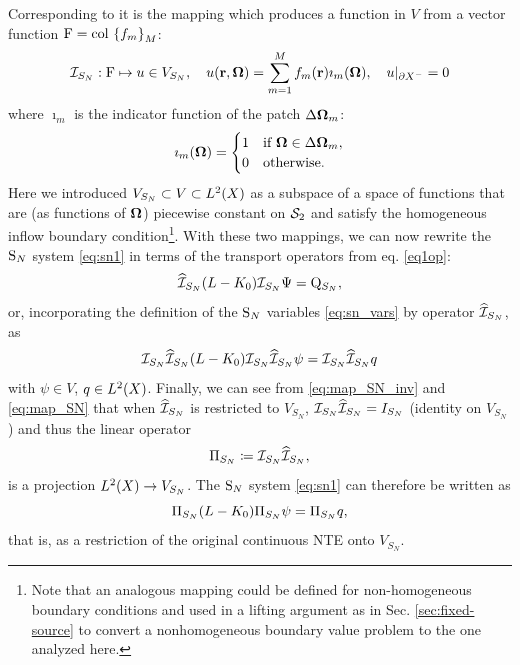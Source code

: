 %
Corresponding to it is the mapping which produces a function in $V$ from a vector function 
\mbox{$\mathrm{F} = \colset{f_m}{\idxset{M}}$}:
\begin{equation}\label{eq:map_SN}
\PiSN: \mathrm{F} \mapsto u\in V_{S_N},\quad
u(\br,\bomega) = \sum_{m=1}^M f_m(\br)\imath_m(\bomega),\quad
u\vert_{\pX[-]} = 0
\end{equation}
where $\imath_m$ is the indicator function of the patch $\Delta\bomega_m$:
\begin{equation}\label{eq:indicator}
\imath_m(\bomega) = \pw{1}{if $\bomega \in \Delta\bomega_m$}{0}{otherwise.}
\end{equation}
Here we introduced $V_{S_N}\subset V \subset \Lp[2](X)$ as a subspace of a space of functions that
are (as functions of $\bomega$) piecewise constant on $\Sphere$ and satisfy the homogeneous inflow boundary condition\footnote{Note that an
analogous mapping could be defined for non-homogeneous boundary conditions and used in a lifting argument
as in Sec. \ref{sec:fixed-source} to convert a nonhomogeneous boundary value problem to the one analyzed here.}. With
these two mappings, we can now rewrite the $\SN$ system \eqref{eq:sn1} in terms of the transport operators from eq.
\eqref{eq1op}:
\begin{equation}\label{eq:sn_op}
	\PihSN (\op{L} - \op{K}_0) \PiSN \Psi = \mathrm{Q}_{S_N},
\end{equation}
or, incorporating the definition of the $\SN$ variables \eqref{eq:sn_vars} by operator $\PihSN$, as
\begin{equation}\label{eq:sn_op2}
	\PiSN \PihSN (\op{L} - \op{K}_0)\PiSN \PihSN \psi = \PiSN \PihSN q
\end{equation} 
with $\psi \in V$, $q \in \Lp[2](X)$. Finally, we can see from \eqref{eq:map_SN_inv} and \eqref{eq:map_SN} that when
$\PihSN$ is restricted to $V_{S_N}$, $\PiSN\PihSN = I_{S_N}$ (identity on $V_{S_N}$) and thus the linear operator
\begin{equation}\label{eq:proj_sn}
	\Projop[S_N] \coloneqq \PiSN\PihSN,
\end{equation}
is a projection $\Lp[2](X)\to V_{S_N}$. The $\SN$ system \eqref{eq:sn1} can
therefore be written as
\begin{equation}\label{eq:sn_op3}
	\Projop[S_N] (\op{L} - \op{K}_0)\Projop[S_N] \psi = \Projop[S_N] q,
\end{equation}
that is, as a restriction of the original continuous NTE onto $V_{S_N}$. 

